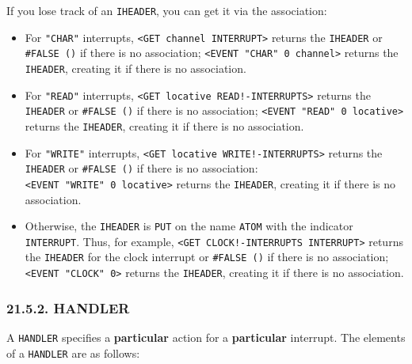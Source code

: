 \documentclass[a4paper,]{article}
\providecommand{\tightlist}{%
  \setlength{\itemsep}{0pt}\setlength{\parskip}{0pt}}
\begin{document}
If you lose track of an \texttt{IHEADER}, you can get it via the association:

\begin{itemize}
\tightlist
\item
  For \texttt{"CHAR"} interrupts,
  \texttt{\textless{}GET\ channel\ INTERRUPT\textgreater{}} returns the \texttt{IHEADER}
  or \texttt{\#FALSE\ ()} if there is no association;
  \texttt{\textless{}EVENT\ "CHAR"\ 0\ channel\textgreater{}} returns the \texttt{IHEADER}, creating
  it if there is no association.
\item
  For \texttt{"READ"} interrupts, \texttt{\textless{}GET\ locative\ READ!-INTERRUPTS\textgreater{}} returns the
  \texttt{IHEADER} or \texttt{\#FALSE\ ()} if there is no association;
  \texttt{\textless{}EVENT\ "READ"\ 0\ locative\textgreater{}} returns the \texttt{IHEADER}, creating it if there is no
  association.
\item
  For \texttt{"WRITE"} interrupts, \texttt{\textless{}GET\ locative\ WRITE!-INTERRUPTS\textgreater{}} returns the
  \texttt{IHEADER} or \texttt{\#FALSE\ ()} if there is no association:
  \texttt{\textless{}EVENT\ "WRITE"\ 0\ locative\textgreater{}} returns the \texttt{IHEADER}, creating it if there is no
  association.
\item
  Otherwise, the \texttt{IHEADER} is \texttt{PUT} on the name \texttt{ATOM} with the indicator \texttt{INTERRUPT}. Thus,
  for example, \texttt{\textless{}GET\ CLOCK!-INTERRUPTS\ INTERRUPT\textgreater{}} returns the \texttt{IHEADER} for the
  clock interrupt or \texttt{\#FALSE\ ()} if there is no association; \texttt{\textless{}EVENT\ "CLOCK"\ 0\textgreater{}}
  returns the \texttt{IHEADER}, creating it if there is no association.
\end{itemize}

\subsubsection{21.5.2. HANDLER}\label{handler}

A \texttt{HANDLER} specifies a \textbf{particular} action for a \textbf{particular} interrupt. The elements of a
\texttt{HANDLER} are as follows:
\end{document}
